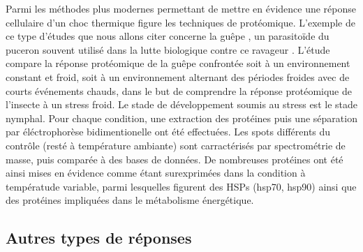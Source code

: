 		Parmi les méthodes plus modernes permettant de mettre en évidence une réponse cellulaire d'un choc thermique figure les techniques de protéomique.
		L'exemple de ce type d'études que nous allons citer concerne la guêpe , un parasitoïde du puceron souvent utilisé dans la lutte biologique contre ce ravageur \cite{colinet2007}.
		L'étude compare la réponse protéomique de la guêpe confrontée soit à un environnement constant et froid, soit à un environnement alternant des périodes froides avec de courts événements chauds, dans le but de comprendre la réponse protéomique de l'insecte à un stress froid.
		Le stade de développement soumis au stress est le stade nymphal.
		Pour chaque condition, une extraction des protéines puis une séparation par éléctrophorèse bidimentionelle ont été effectuées.
		Les spots différents du contrôle (resté à température ambiante) sont carractérisés par spectrométrie de masse, puis comparée à des bases de données.
		De nombreuses protéines ont été ainsi mises en évidence comme étant surexprimées dans la condition à températude variable, parmi lesquelles figurent des HSPs (hsp70, hsp90) ainsi que des protéines impliquées dans le métabolisme énergétique.



		\subsection{Autres types de réponses} %

